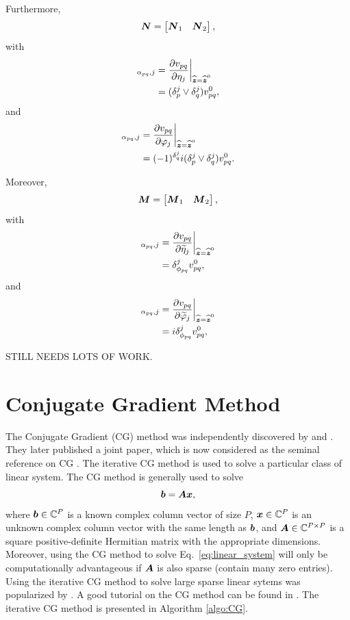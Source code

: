 \documentclass[useAMS,usenatbib]{mn2e}
\newcommand{\bz}{\bmath{z}}
\newcommand{\bA}{\bmath{A}}
\newcommand{\bN}{\bmath{N}}
\newcommand{\bM}{\bmath{M}}
\newcommand{\bb}{\bmath{b}}
\newcommand{\bx}{\bmath{x}}
\begin{document}
Furthermore, 
\begin{equation}
\bN = \begin{bmatrix}
      \bN_1 & \bN_2 
      \end{bmatrix},
\end{equation}
with 
\begin{align}
[\bN_1]_{\alpha_{pq},j} &= \frac{\partial v_{pq}}{\partial \eta_j} {\bigg |}_{\widehat{\bz}=\widehat{\bz}^0}\\
&= (\delta_{p}^{j}\vee\delta_{q}^{j}) v_{pq}^0,
\end{align}
and
\begin{align}
 [\bN_2]_{\alpha_{pq},j} &= \frac{\partial v_{pq}}{\partial \varphi_j} {\bigg |}_{\widehat{\bz}=\widehat{\bz}^0}\\
 &= (-1)^{\delta_{q}^{j}}i(\delta_{p}^{j}\vee\delta_{q}^{j}) v_{pq}^0. 
\end{align}

Moreover,
\begin{equation}
\bM = \begin{bmatrix}
      \bM_1 & \bM_2 
      \end{bmatrix},
\end{equation}
with
\begin{align}
[\bM_1]_{\alpha_{pq},j} &= \frac{\partial v_{pq}}{\partial \widetilde{\eta}_j} {\bigg |}_{\widehat{\bz}=\widehat{\bz}^0}\\
&=  \delta_{\phi_{pq}}^{j} v_{pq}^0,
\end{align}
and
\begin{align}
[\bM_2]_{\alpha_{pq},j} &= \frac{\partial v_{pq}}{\partial \widetilde{\varphi}_j} {\bigg |}_{\widehat{\bz}=\widehat{\bz}^0}\\
&= i\delta_{\phi_{pq}}^{j} v_{pq}^0,
\end{align}

STILL NEEDS LOTS OF WORK.

\section{Conjugate Gradient Method}
The Conjugate Gradient (CG) method was independently discovered by \citet{Hestenes1973} and \citet{Stiefel1952}. They later published a joint paper, which is now considered as the seminal
reference on CG \citep{Hestenes1952}. The iterative CG method is used to solve a particular class of linear system. The CG method is generally used to solve
\begin{equation}
\label{eq:linear_system}
\bb = \bA\bx,
\end{equation}
where $\bb\in\mathbb{C}^P$ is a known complex column vector of size $P$, $\bx\in\mathbb{C}^P$ is an unknown complex column vector with the same length as $\bb$, and $\bA\in\mathbb{C}^{P\times P}$ is a square positive-definite Hermitian matrix with the appropriate dimensions.  
Moreover, using the CG method to solve Eq.~\eqref{eq:linear_system} will only be computationally advantageous if $\bA$ is also sparse (contain many zero entries).
Using the iterative CG method to solve large sparse linear sytems was popularized by \citet{Reid1971}. A good tutorial on the CG method can be found in \citep{Shewchuk1994}.
The iterative CG method is presented in Algorithm \ref{algo:CG}. 
\end{document}

